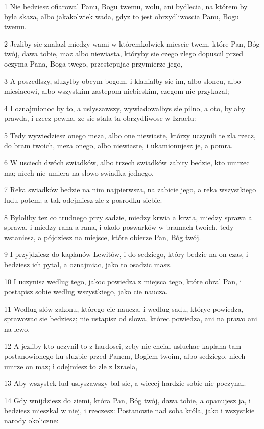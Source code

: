 \par 1 Nie bedziesz ofiarowal Panu, Bogu twemu, wolu, ani bydlecia, na którem by byla skaza, albo jakakolwiek wada, gdyz to jest obrzydliwoscia Panu, Bogu twemu.
\par 2 Jezliby sie znalazl miedzy wami w któremkolwiek miescie twem, które Pan, Bóg twój, dawa tobie, maz albo niewiasta, któryby sie czego zlego dopuscil przed oczyma Pana, Boga twego, przestepujac przymierze jego,
\par 3 A poszedlszy, sluzylby obcym bogom, i klanialby sie im, albo sloncu, albo miesiacowi, albo wszystkim zastepom niebieskim, czegom nie przykazal;
\par 4 I oznajmionoc by to, a uslyszawszy, wywiadowalbys sie pilno, a oto, bylaby prawda, i rzecz pewna, ze sie stala ta obrzydliwosc w Izraelu:
\par 5 Tedy wywiedziesz onego meza, albo one niewiaste, którzy uczynili te zla rzecz, do bram twoich, meza onego, albo niewiaste, i ukamionujesz je, a pomra.
\par 6 W usciech dwóch swiadków, albo trzech swiadków zabity bedzie, kto umrzec ma; niech nie umiera na slowo swiadka jednego.
\par 7 Reka swiadków bedzie na nim najpierwsza, na zabicie jego, a reka wszystkiego ludu potem; a tak odejmiesz zle z posrodku siebie.
\par 8 Byloliby tez co trudnego przy sadzie, miedzy krwia a krwia, miedzy sprawa a sprawa, i miedzy rana a rana, i okolo poswarków w bramach twoich, tedy wstaniesz, a pójdziesz na miejsce, które obierze Pan, Bóg twój.
\par 9 I przyjdziesz do kaplanów Lewitów, i do sedziego, który bedzie na on czas, i bedziesz ich pytal, a oznajmiac, jako to osadzic masz.
\par 10 I uczynisz wedlug tego, jakoc powiedza z miejsca tego, które obral Pan, i postapisz sobie wedlug wszystkiego, jako cie naucza.
\par 11 Wedlug slów zakonu, którego cie naucza, i wedlug sadu, któryc powiedza, sprawowac sie bedziesz; nie ustapisz od slowa, którec powiedza, ani na prawo ani na lewo.
\par 12 A jezliby kto uczynil to z hardosci, zeby nie chcial usluchac kaplana tam postanowionego ku sluzbie przed Panem, Bogiem twoim, albo sedziego, niech umrze on maz; i odejmiesz to zle z Izraela,
\par 13 Aby wszystek lud uslyszawszy bal sie, a wiecej hardzie sobie nie poczynal.
\par 14 Gdy wnijdziesz do ziemi, która Pan, Bóg twój, dawa tobie, a opanujesz ja, i bedziesz mieszkal w niej, i rzeczesz: Postanowie nad soba króla, jako i wszystkie narody okoliczne:
